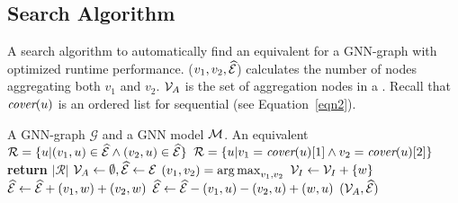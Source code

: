 \subsection{Search Algorithm}
\label{subsec:greedy}
\begin{algorithm}[t]
\caption{A \xg search algorithm to automatically find an equivalent \xg for a GNN-graph with optimized runtime performance.
($v_1, v_2, \mathcal{\widehat{E}}$) calculates the number of nodes aggregating both $v_1$ and $v_2$.
$\mathcal{V}_A$ is the set of aggregation nodes in a \xg. 
Recall that $\mbox{\rm\em cover}(u)$ is an ordered list for sequential  (see Equation~\ref{eqn2}).}
\label{alg3}
\begin{algorithmic}[1]
 A GNN-graph $\mathcal{G}$ and a GNN model $\mathcal{M}$.
 An equivalent \xg 
\State 
{}
\State $\mathcal{R} = \{ u | (v_1, u) \in \mathcal{\widehat{E}} \wedge (v_2, u) \in \mathcal{\widehat{E}}\}$
\Else
\State $\mathcal{R} = \{ u | v_1 = \mbox{\rm\em cover}(u)[1] \wedge v_2 = \mbox{\rm\em cover}(u)[2]\}$
\EndIf
\State \textbf{return} $|\mathcal{R}|$
\EndFunction
\State
\State $\mathcal{V}_A \leftarrow \emptyset, \mathcal{\widehat{E}} \leftarrow \mathcal{E}$
\State $(v_1, v_2) = \operatorname*{arg\,max}_{v_1, v_2}$ 
\State $\mathcal{V}_I \leftarrow \mathcal{V}_I + \{w\}$ 
\State $\mathcal{\widehat{E}} \leftarrow \mathcal{\widehat{E}} + (v_1, w) + (v_2, w)$
\State $\mathcal{\widehat{E}} \leftarrow \mathcal{\widehat{E}} - (v_1, u) - (v_2, u) + (w, u)$
\EndIf
\EndFor
\EndIf
\EndWhile
{} $(\mathcal{V}_A, \mathcal{\widehat{E}})$
\end{algorithmic}
\end{algorithm}

